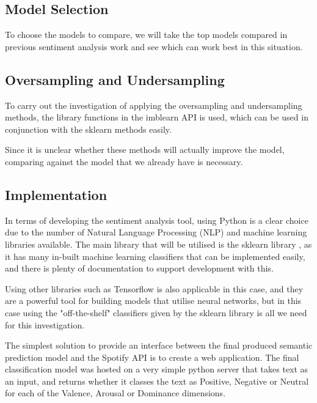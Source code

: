 \subsection{Model Selection}

To choose the models to compare, we will take the top models compared in previous sentiment analysis work \cite{towardsDS} and see which can work best in this situation. 

\subsection{Oversampling and Undersampling}

To carry out the investigation of applying the oversampling and undersampling methods, the library functions in the imblearn API is used, which can be used in conjunction with the sklearn methods easily.

Since it is unclear whether these methods will actually improve the model, comparing against the model that we already have is necessary.


\subsection{Implementation}

In terms of developing the sentiment analysis tool, using Python is a clear choice due to the number of Natural Language Processing (NLP) and machine learning libraries available. The main library that will be utilised is the sklearn library \cite{sklearn}, as it has many in-built machine learning classifiers that can be implemented easily, and there is plenty of documentation to support development with this. 

Using other libraries such as Tensorflow is also applicable in this case,  and they are a powerful tool for building models that utilise neural networks, but in this case using the "off-the-shelf" classifiers given by the sklearn library is all we need for this investigation.

The simplest solution to provide an interface between the final produced semantic prediction model and the Spotify API is to create a web application.  The final classification model was hosted on a very simple python server that takes text as an input, and returns whether it classes the text as Positive, Negative or Neutral for each of the Valence, Arousal or Dominance dimensions. 

